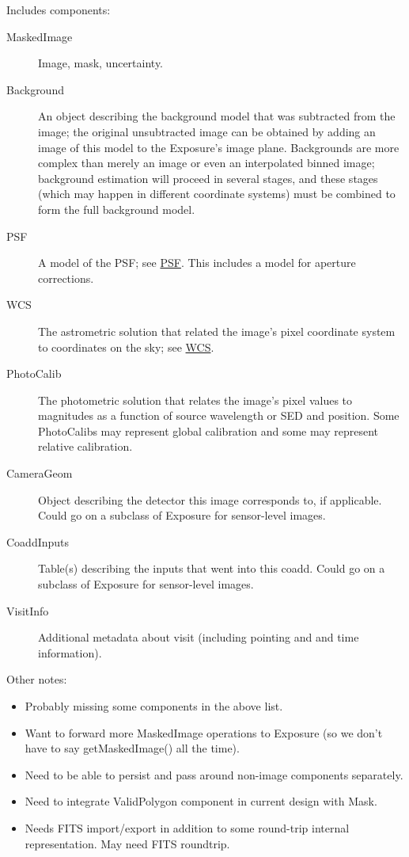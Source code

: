 Includes components:
\begin{description}
\item[MaskedImage] Image, mask, uncertainty.
\item[Background] An object describing the background model that was subtracted from the image; the original unsubtracted image can be obtained by adding an image of this model to the Exposure's image plane.  Backgrounds are more complex than merely an image or even an interpolated binned image; background estimation will proceed in several stages, and these stages (which may happen in different coordinate systems) must be combined to form the full background model.
\item[PSF] A model of the PSF; see \hyperref[sec:spPSF]{PSF}.  This includes a model for aperture corrections.
\item[WCS] The astrometric solution that related the image's pixel coordinate system to coordinates on the sky; see \hyperref[sec:spWCS]{WCS}.
\item[PhotoCalib] The photometric solution that relates the image's pixel values to magnitudes as a function of source wavelength or SED and position.  Some PhotoCalibs may represent global calibration and some may represent relative calibration.
\item[CameraGeom] Object describing the detector this image corresponds to, if applicable.  Could go on a subclass of Exposure for sensor-level images.
\item[CoaddInputs] Table(s) describing the inputs that went into this coadd.  Could go on a subclass of Exposure for sensor-level images.
\item[VisitInfo] Additional metadata about visit (including pointing and and time information).
\end{description}

Other notes:
\begin{itemize}
\item Probably missing some components in the above list.
\item Want to forward more MaskedImage operations to Exposure (so we don't have to say getMaskedImage() all the time).
\item Need to be able to persist and pass around non-image components separately.
\item Need to integrate ValidPolygon component in current design with Mask.
\item Needs FITS import/export in addition to some round-trip internal representation.  May need FITS roundtrip.
\end{itemize}


